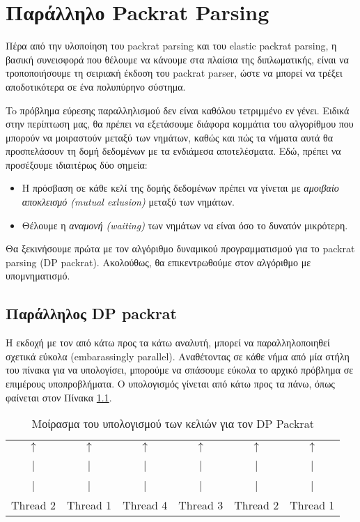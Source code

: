 \chapter{ Παράλληλο Packrat Parsing }
\label{ch:parallel}

Πέρα από την υλοποίηση του packrat parsing και του elastic packrat parsing, η βασική συνεισφορά που θέλουμε να κάνουμε στα πλαίσια της διπλωματικής, είναι να τροποποιήσουμε τη σειριακή έκδοση του packrat parser, ώστε να μπορεί να τρέξει αποδοτικότερα σε ένα πολυπύρηνο σύστημα.

To πρόβλημα εύρεσης παραλληλισμού δεν είναι καθόλου τετριμμένο εν γένει. 
Ειδικά στην περίπτωση μας, θα πρέπει να εξετάσουμε διάφορα κομμάτια του αλγορίθμου που μπορούν να μοιραστούν μεταξύ των νημάτων, καθώς και πώς τα νήματα αυτά θα προσπελάσουν τη δομή δεδομένων με τα ενδιάμεσα αποτελέσματα.
Εδώ, πρέπει να προσέξουμε ιδιαιτέρως δύο σημεία:

\begin{itemize}
	\item Η πρόσβαση σε κάθε κελί της δομής δεδομένων πρέπει να γίνεται με \textit{αμοιβαίο αποκλεισμό (mutual exlusion)} μεταξύ των νημάτων.
	\item Θέλουμε η \textit{αναμονή (waiting)} των νημάτων να είναι όσο το δυνατόν μικρότερη.
\end{itemize}

Θα ξεκινήσουμε πρώτα με τον αλγόριθμο δυναμικού προγραμματισμού για το packrat parsing (DP packrat).
Ακολούθως, θα επικεντρωθούμε στον αλγόριθμο με υπομνηματισμό.

\section{Παράλληλος DP packrat}

Η εκδοχή με τον από κάτω προς τα κάτω αναλυτή, μπορεί να παραλληλοποιηθεί σχετικά εύκολα (embarassingly parallel). 
Αναθέτοντας σε κάθε νήμα από μία στήλη του πίνακα για να υπολογίσει, μπορούμε να σπάσουμε εύκολα το αρχικό πρόβλημα σε επιμέρους υποπροβλήματα.
Ο υπολογισμός γίνεται από κάτω προς τα πάνω, όπως φαίνεται στον Πίνακα \ref{table:dp}.

\begin{table}[]
  \centering
\begin{tabular}{|c|c|c|c|c|c|}
\hline
 &  &  &  &  & \\ \hline
 $\uparrow$& $\uparrow$ & $\uparrow$ & $\uparrow$ & $\uparrow$ & $\uparrow$ \\ \hline
 | & | & | & | & | & | \\ \hline
 | & | & | & | & | & | \\ \hline
 Thread 2 & Thread 1 & Thread 4 & Thread 3 & Thread 2 & Thread 1  \\ \hline
\end{tabular}
\caption{Μοίρασμα του υπολογισμού των κελιών για τον DP Packrat}
  \label{table:dp}
\end{table}

